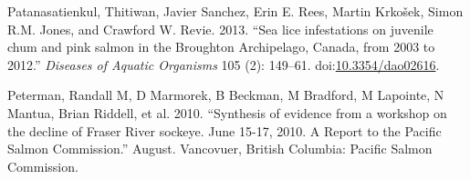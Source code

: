 \documentclass[fleqn,10pt]{wlpeerj} %
\begin{document}
\hypertarget{ref-Patanasatienkul2013}{}
Patanasatienkul, Thitiwan, Javier Sanchez, Erin E. Rees, Martin Krkošek,
Simon R.M. Jones, and Crawford W. Revie. 2013. ``Sea lice infestations
on juvenile chum and pink salmon in the Broughton Archipelago, Canada,
from 2003 to 2012.'' \emph{Diseases of Aquatic Organisms} 105 (2):
149--61. doi:\href{https://doi.org/10.3354/dao02616}{10.3354/dao02616}.

\hypertarget{ref-Peterman2010}{}
Peterman, Randall M, D Marmorek, B Beckman, M Bradford, M Lapointe, N
Mantua, Brian Riddell, et al. 2010. ``Synthesis of evidence from a
workshop on the decline of Fraser River sockeye. June 15-17, 2010. A
Report to the Pacific Salmon Commission.'' August. Vancovuer, British
Columbia: Pacific Salmon Commission.
\end{document}
